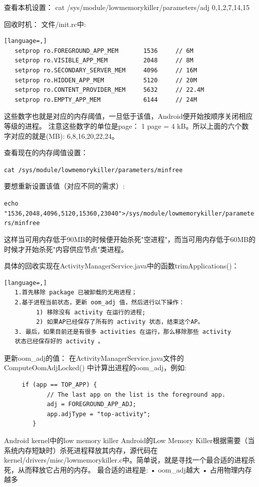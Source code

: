 \documentclass[a4paper, 11pt]{article}
\begin{document}
查看本机设置：
cat /sys/module/lowmemorykiller/parameters/adj
0,1,2,7,14,15
 
回收时机：
文件/init.rc中:
\begin{lstlisting}[language=,]
   setprop ro.FOREGROUND_APP_MEM       1536     // 6M
   setprop ro.VISIBLE_APP_MEM          2048     // 8M
   setprop ro.SECONDARY_SERVER_MEM     4096     // 16M
   setprop ro.HIDDEN_APP_MEM           5120     // 20M
   setprop ro.CONTENT_PROVIDER_MEM     5632     // 22.4M
   setprop ro.EMPTY_APP_MEM            6144     // 24M
\end{lstlisting}
这些数字也就是对应的内存阈值，一旦低于该值，Android便开始按顺序关闭相应等级的进程。
注意这些数字的单位是page： 1 page = 4 kB。所以上面的六个数字对应的就是(MB): 6,8,16,20,22,24。
 
查看现在的内存阈值设置：

\lstinline{cat /sys/module/lowmemorykiller/parameters/minfree}

要想重新设置该值（对应不同的需求）:

\lstinline{echo "1536,2048,4096,5120,15360,23040">/sys/module/lowmemorykiller/parameters/minfree}

这样当可用内存低于90MB的时候便开始杀死"空进程"，而当可用内存低于60MB的时候才开始杀死"内容供应节点"类进程。
 
具体的回收实现在ActivityManagerService.java中的函数trimApplications()：
\begin{lstlisting}[language=,]
   1.首先移除 package 已被卸载的无用进程；
   2.基于进程当前状态，更新 oom_adj 值，然后进行以下操作：
         1) 移除没有 activity 在运行的进程;
         2) 如果AP已经保存了所有的 activity 状态，结束这个AP。
   3. 最后，如果目前还是有很多 activities 在运行，那么移除那些 activity
   状态已经保存好的 activity 。
\end{lstlisting}
 

更新oom_adj的值：
在ActivityManagerService.java文件的ComputeOomAdjLocked() 中计算出进程的oom_adj，例如:
\begin{lstlisting}
     if (app == TOP_APP) {
            // The last app on the list is the foreground app.
            adj = FOREGROUND_APP_ADJ;
            app.adjType = "top-activity";
        }
\end{lstlisting}
 
Android kernel中的low memory killer
Android的Low Memory Killer根据需要（当系统内存短缺时）杀死进程释放其内存，源代码在kernel/drivers/misc/lowmemorykiller.c中。简单说，就是寻找一个最合适的进程杀死，从而释放它占用的内存。
最合适的进程是:
   •  oom_adj越大
   •  占用物理内存越多
 
\end{document}

